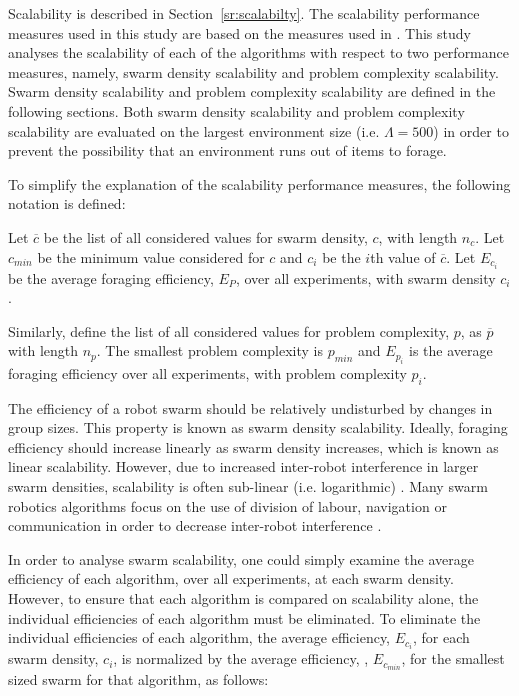 \documentclass[preprint,12pt]{elsarticle}
\begin{document}
Scalability is described in Section~\ref{sr:scalabilty}. The scalability performance measures used in this study are based on the measures used in \cite{hecker2015beyond}. This study analyses the scalability of each of the algorithms with respect to two performance measures, namely, swarm density scalability and problem complexity scalability. Swarm density scalability and problem complexity scalability are defined in the following sections. Both swarm density scalability and problem complexity scalability are evaluated on the largest environment size (i.e. $\Lambda=500$) in order to prevent the possibility that an environment runs out of items to forage.

To simplify the explanation of the scalability performance measures, the following notation is defined:

Let $\overline{c}$ be the list of all considered values for swarm density, $c$, with length $n_c$. Let $c_{min}$ be the minimum value considered for $c$ and $c_i$ be the $i$th value of $\overline{c}$. Let $E_{c_i}$ be the average foraging efficiency, $E_P$, over all experiments, with swarm density $c_i$.

Similarly, define the list of all considered values for problem complexity, $p$, as $\overline{p}$ with length $n_p$. The smallest problem complexity is $p_{min}$ and $E_{p_i}$ is the average foraging efficiency over all experiments, with problem complexity $p_i$.



The efficiency of a robot swarm should be relatively undisturbed by changes in group sizes. This property is known as swarm density scalability. Ideally, foraging efficiency should increase linearly as swarm density increases, which is known as linear scalability. However, due to increased inter-robot interference in larger swarm densities, scalability is often sub-linear (i.e. logarithmic) \cite{lerman2002mathematical}. Many swarm robotics algorithms focus on the use of division of labour, navigation or communication in order to decrease inter-robot interference \cite{lerman2002mathematical, schneider1998territorial}.

In order to analyse swarm scalability, one could simply examine the average efficiency of each algorithm, over all experiments, at each swarm density. However, to ensure that each algorithm is compared on scalability alone, the individual efficiencies of each algorithm must be eliminated. To eliminate the individual efficiencies of each algorithm, the average efficiency, $E_{c_i}$, for each swarm density, $c_i$, is normalized by the average efficiency, , $E_{c_{min}}$, for the smallest sized swarm for that algorithm, as follows: 
\end{document}
